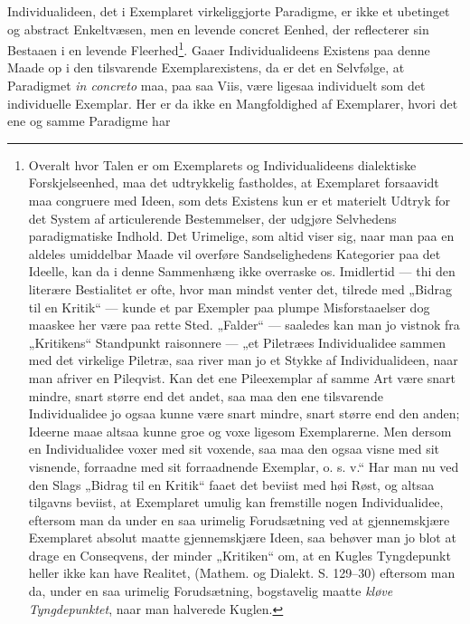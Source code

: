 \documentclass[11pt]{book}
\newcommand{\opage}[1]{\marginnote{\footnotesize\textit{[#1]}}}
\begin{document}
Individualideen, det i Exemplaret virkeliggjorte Paradigme, er ikke
et ubetinget og abstract Enkeltvæsen, men en levende concret Eenhed,
der reflecterer sin Bestaaen i en levende Fleerhed\footnote{Overalt
hvor Talen er om Exemplarets og Individualideens dialektiske
Forskjelseenhed, maa det udtrykkelig fastholdes, at Exemplaret
forsaavidt maa congruere med Ideen, som dets Existens kun er et
materielt Udtryk for det System af articulerende Bestemmelser, der
udgjøre Selvhedens paradigmatiske Indhold. Det
Urimelige, som altid viser sig, naar man paa en aldeles umiddelbar
Maade vil overføre Sandselighedens Kategorier paa det Ideelle, kan da
i denne Sammenhæng ikke overraske os. Imidlertid --- thi den
literære Bestialitet er ofte, hvor man mindst venter det, tilrede med
„Bidrag til en Kritik“ --- kunde et par Exempler paa plumpe
Misforstaaelser dog maaskee her være paa rette Sted. „Falder“ ---
saaledes kan man jo vistnok fra „Kritikens“ Standpunkt raisonnere ---
„et Piletræes Individualidee sammen med det virkelige Piletræ, saa
river man jo et Stykke af Individualideen, naar man afriver en
Pileqvist. Kan det ene Pileexemplar af samme Art være snart mindre,
snart større end det andet, saa maa den ene tilsvarende Individualidee
jo ogsaa kunne være snart mindre, snart større end den anden;
Ideerne maae altsaa kunne groe og voxe ligesom Exemplarerne. Men
dersom en Individualidee voxer med sit voxende, saa maa den ogsaa
visne med sit visnende, forraadne med sit forraadnende Exemplar,
o. s. v.“ Har man nu ved den Slags „Bidrag til en Kritik“ faaet det
beviist med høi Røst, og altsaa tilgavns beviist, at Exemplaret umulig
kan fremstille nogen Individualidee, eftersom man da under en saa
urimelig Forudsætning ved at gjennemskjære Exemplaret absolut maatte
gjennemskjære Ideen, saa behøver man jo blot at drage en Conseqvens,
der minder „Kritiken“ om, at en Kugles Tyngdepunkt heller ikke kan
have Realitet, (Mathem. og Dialekt. S. 129--30) eftersom man da,
under en saa urimelig Forudsætning, bogstavelig maatte \emph{kløve
Tyngdepunktet}, naar man halverede Kuglen.}. Gaaer Individualideens
Existens paa
\opage{320} \setcounter{footnote}{0}%
denne Maade op i den tilsvarende Exemplarexistens, da er det en
Selvfølge, at Paradigmet \textit{in concreto} maa, paa saa Viis, være
ligesaa individuelt som det individuelle Exemplar. Her er da ikke en
Mangfoldighed af Exemplarer, hvori det ene og samme Paradigme har
\end{document}
